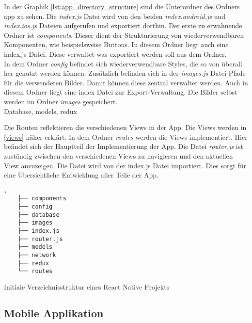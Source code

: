  In der Graphik \ref{lst:app_directory_structure} sind die Unterordner des Ordners app zu sehen. Die \textit{index.js} Datei wird von den beiden \textit{index.android.js} und \textit{index.ios.js} Dateien aufgerufen und exportiert dorthin.  Der erste zu erwähnende Ordner ist \textit{components}. Dieser dient der Strukturierung von wiederverwendbaren Komponenten, wie beispielsweise Buttons. In diesem Ordner liegt auch eine index.js Datei. Diese verwaltet was exportiert werden soll aus dem Ordner. \\
 
 In dem Ordner \textit{config} befindet sich wiederverwendbare Styles, die so von überall her genutzt werden können. Zusätzlich befinden sich in der \textit{images.js} Datei Pfade für die verwendeten Bilder. Damit können diese zentral verwaltet werden. Auch in diesem Ordner liegt eine index Datei zur Export-Verwaltung. Die Bilder selbst werden im Ordner \textit{images} gespeichert.\\
 
 Database, models, redux
 
 Die Routen reflektieren die verschiedenen Views in der App. Die Views werden in \ref{views} näher erklärt. In dem Ordner \textit{routes} werden die Views implementiert. Hier befindet sich der Hauptteil der Implementierung der App. Die Datei \textit{router.js} ist zuständig zwischen den verschiedenen Views zu navigieren und den aktuellen View anzuzeigen. Die Datei wird von der index.js Datei importiert. Dies sorgt für eine Übersichtliche Entwicklung aller Teile der App.
 
    \begin{lstlisting}[style=tree]
    .
    ├── components
    ├── config
    ├── database
    ├── images
    ├── index.js
    ├── router.js
    ├── models
    ├── network
    ├── redux
    └── routes

    \end{lstlisting}
    \vspace{-0.5 cm}
    \begin{listing}[H]
        \caption{Initiale Verzeichnisstruktur eines React Native Projekts}
        \label{lst:app_directory_structure}
    \end{listing}
        
        
        
    \subsection{Mobile Applikation}
        
